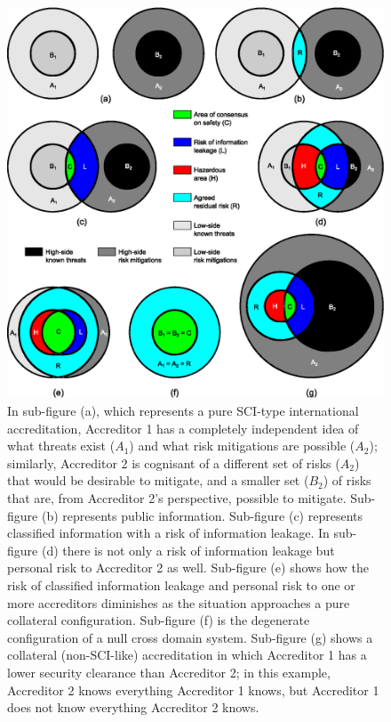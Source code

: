 \documentclass[10pt,letterpaper,conference]{IEEEtran}
\begin{document}
\begin{figure}[!t]
    \centering
	\includegraphics[width=\textwidth,bb=0 0 557 576]{venn_diagrams_for_paper-corrected.eps}
	\caption{In sub-figure (a), which represents a pure SCI-type international accreditation,
		Accreditor 1 has a completely independent idea of what threats exist ($A_1$) and what
		risk mitigations are possible ($A_2$); similarly, Accreditor 2 is cognisant of a
		different set of risks ($A_2$) that would be desirable to mitigate, and a smaller
		set ($B_2$) of risks that are, from Accreditor 2's perspective, possible to mitigate.
		Sub-figure (b) represents public information. Sub-figure (c) represents classified
		information with a risk of information leakage. In sub-figure (d) there is not only
		a risk of information leakage but personal risk to Accreditor 2 as well. Sub-figure
		(e) shows how the risk of classified information leakage and personal risk to one or
		more accreditors diminishes as the situation approaches a pure collateral configuration.
		Sub-figure (f) is the degenerate configuration of a null cross domain system.
		Sub-figure (g) shows a collateral (non-SCI-like) accreditation in which Accreditor 1
		has a lower security clearance than Accreditor 2; in this example, Accreditor 2 knows
		everything Accreditor 1 knows, but Accreditor 1 does not know everything Accreditor 2
		knows.}
		\label{figure:accreditor-model}
\end{figure}
\end{document}
